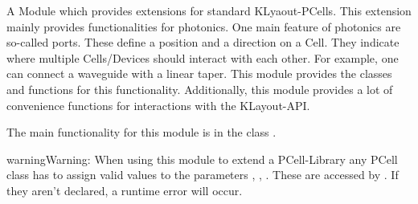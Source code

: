 \documentclass[a4paper,10pt,english]{sphinxmanual}
\begin{document}
A Module which provides extensions for standard KLyaout-PCells. This extension mainly provides functionalities for
photonics. One main feature of photonics are so-called ports. These define a position and a direction on a Cell.
They indicate where multiple Cells/Devices should interact with each other. For example, one can connect a waveguide
with a linear taper. This module provides the classes and functions for this functionality. Additionally, this module
provides a lot of convenience functions for interactions with the KLayout-API.

The main functionality for this module is in the class {\hyperref[\detokenize{photonics/photonics:kppc.photonics.PhotDevice}]{}}.

\begin{sphinxadmonition}{warning}{Warning:}
When using this module to extend a PCell-Library any PCell class has to assign valid values to the
parameters  ,  ,  . These are accessed by {\hyperref[\detokenize{photonics/photonics:kppc.photonics.PhotDevice}]{}}. If they
aren’t declared, a runtime error will occur.
\end{sphinxadmonition}
\end{document}
